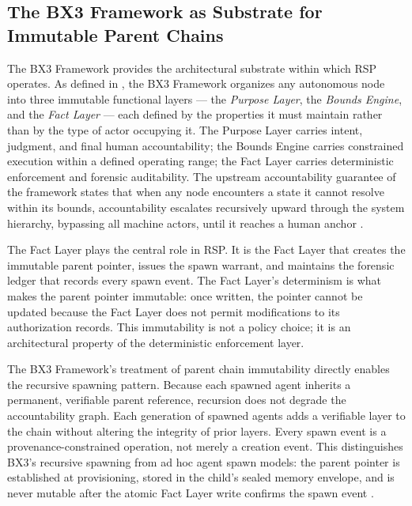 \subsection{The BX3 Framework as Substrate for Immutable Parent Chains}

The BX3 Framework provides the architectural substrate within which RSP operates. As defined in \cite{bx3framework,bx3framework2026}, the BX3 Framework organizes any autonomous node into three immutable functional layers — the \textit{Purpose Layer}, the \textit{Bounds Engine}, and the \textit{Fact Layer} — each defined by the properties it must maintain rather than by the type of actor occupying it. The Purpose Layer carries intent, judgment, and final human accountability; the Bounds Engine carries constrained execution within a defined operating range; the Fact Layer carries deterministic enforcement and forensic auditability. The upstream accountability guarantee of the framework states that when any node encounters a state it cannot resolve within its bounds, accountability escalates recursively upward through the system hierarchy, bypassing all machine actors, until it reaches a human anchor \cite{bx3framework2026}.

The Fact Layer plays the central role in RSP. It is the Fact Layer that creates the immutable parent pointer, issues the spawn warrant, and maintains the forensic ledger that records every spawn event. The Fact Layer's determinism is what makes the parent pointer immutable: once written, the pointer cannot be updated because the Fact Layer does not permit modifications to its authorization records. This immutability is not a policy choice; it is an architectural property of the deterministic enforcement layer.

The BX3 Framework's treatment of parent chain immutability directly enables the recursive spawning pattern. Because each spawned agent inherits a permanent, verifiable parent reference, recursion does not degrade the accountability graph. Each generation of spawned agents adds a verifiable layer to the chain without altering the integrity of prior layers. Every spawn event is a provenance-constrained operation, not merely a creation event. This distinguishes BX3's recursive spawning from ad hoc agent spawn models: the parent pointer is established at provisioning, stored in the child's sealed memory envelope, and is never mutable after the atomic Fact Layer write confirms the spawn event \cite{bx3framework2026}.

